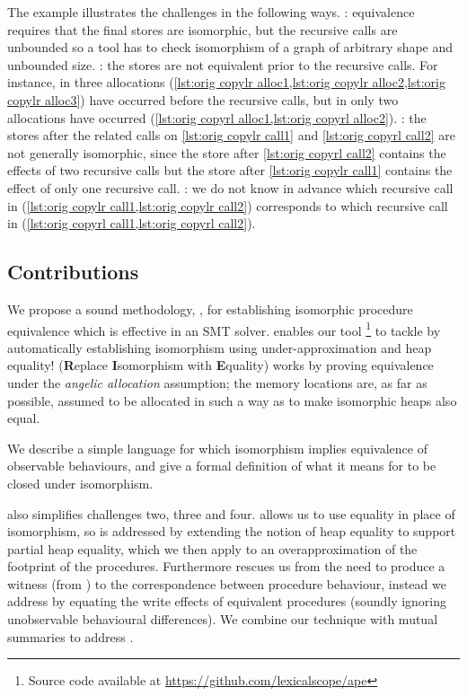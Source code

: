 \documentclass[runningheads,a4paper]{llncs}
\begin{document}
The example illustrates the challenges in the following ways. \textbf{\Cone{}}: equivalence requires that the final stores are isomorphic, but the recursive calls are unbounded so a tool has to check isomorphism of a graph of arbitrary shape and unbounded size. \textbf{\Ctwo{}}: the stores are not equivalent prior to the recursive calls. For instance, in \copylr{} three allocations (\cref{lst:orig copylr alloc1,lst:orig copylr alloc2,lst:orig copylr alloc3}) have occurred before the recursive calls, but in \copyrl{} only two allocations have occurred (\cref{lst:orig copyrl alloc1,lst:orig copyrl alloc2}). \textbf{\Cthree{}}: the stores after the related calls on \cref{lst:orig copylr call1} and \cref{lst:orig copyrl call2} are not generally isomorphic, since the store after \cref{lst:orig copyrl call2} contains the effects of two recursive calls but the store after \cref{lst:orig copylr call1} contains the effect of only one recursive call. \textbf{\Cfour{}}: we do not know in advance which recursive call in \copylr{} (\cref{lst:orig copylr call1,lst:orig copylr call2}) corresponds to which recursive call in \copyrl{} (\cref{lst:orig copyrl call1,lst:orig copyrl call2}).

\subsection{Contributions}

We propose a sound methodology, \metho{}, for establishing isomorphic procedure equivalence which is effective in an SMT solver. \metho{} enables our tool \tool{} \footnote{Source code available at \url{https://github.com/lexicalscope/ape}} to tackle \textbf{\cone{}} by automatically establishing isomorphism using under-approximation and heap equality! \metho{} (\textbf{R}eplace \textbf{I}somorphism with \textbf{E}quality) works by proving equivalence under the \emph{angelic allocation} assumption; the memory locations are, as far as possible, assumed to be allocated in such a way as to make isomorphic heaps also equal. 

We describe a simple language \lang{} for which isomorphism implies equivalence of observable behaviours, and give a formal definition of what it means for \lang{} to be closed under isomorphism.

\metho{} also simplifies challenges two, three and four. \metho{} allows us to use equality in place of isomorphism, so \textbf{\ctwo{}} is addressed by extending the notion of heap equality to support partial heap equality, which we then apply to an overapproximation of the footprint of the procedures. Furthermore \metho{} rescues us from the need to produce a witness (from \textbf{\cone{}}) to the correspondence between procedure behaviour, instead we address \textbf{\cthree{}} by equating the write effects of equivalent procedures (soundly ignoring unobservable behavioural differences). We combine our technique with mutual summaries to address \textbf{\cfour{}}.
\end{document}
